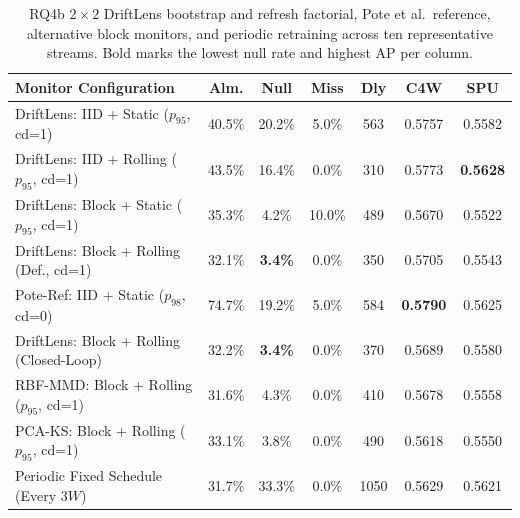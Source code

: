 \documentclass[pdflatex,sn-basic]{sn-jnl}
\theoremstyle{definition}
\theoremstyle{plain}
\begin{document}
\begin{table}[t]
\centering
\caption{RQ4b $2\times 2$ DriftLens bootstrap and refresh factorial, Pote et al.\ reference, alternative block monitors, and periodic retraining across ten representative streams. Bold marks the lowest null rate and highest AP per column.}
\label{tab:rq4b_monitors}
\fontsize{7.5}{9.0}\selectfont
\setlength{\tabcolsep}{1.5pt}
\begin{tabular*}{\textwidth}{@{\extracolsep\fill}lcccccc@{}}
\toprule
\textbf{Monitor Configuration} & \textbf{Alm.} & \textbf{Null} & \textbf{Miss} & \textbf{Dly} & \textbf{C4W} & \textbf{SPU} \\
\midrule
DriftLens: IID + Static ($p_{95}$, cd=1) & 40.5\% & 20.2\% & 5.0\% & 563 & 0.5757 & 0.5582 \\
DriftLens: IID + Rolling ($p_{95}$, cd=1) & 43.5\% & 16.4\% & 0.0\% & 310 & 0.5773 & \textbf{0.5628} \\
DriftLens: Block + Static ($p_{95}$, cd=1) & 35.3\% & 4.2\% & 10.0\% & 489 & 0.5670 & 0.5522 \\
DriftLens: Block + Rolling (Def., cd=1) & 32.1\% & \textbf{3.4\%} & 0.0\% & 350 & 0.5705 & 0.5543 \\
\midrule
Pote-Ref: IID + Static ($p_{98}$, cd=0) & 74.7\% & 19.2\% & 5.0\% & 584 & \textbf{0.5790} & 0.5625 \\
DriftLens: Block + Rolling (Closed-Loop) & 32.2\% & \textbf{3.4\%} & 0.0\% & 370 & 0.5689 & 0.5580 \\
RBF-MMD: Block + Rolling ($p_{95}$, cd=1) & 31.6\% & 4.3\% & 0.0\% & 410 & 0.5678 & 0.5558 \\
PCA-KS: Block + Rolling ($p_{95}$, cd=1) & 33.1\% & 3.8\% & 0.0\% & 490 & 0.5618 & 0.5550 \\
Periodic Fixed Schedule (Every $3W$) & 31.7\% & 33.3\% & 0.0\% & 1050 & 0.5629 & 0.5621 \\
\bottomrule
\end{tabular*}
\vspace{2pt}\par{}
\end{table}
\end{document}
